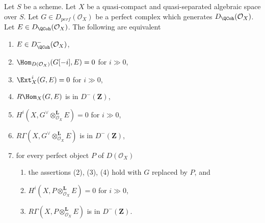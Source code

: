 \begin{proposition}
\label{proposition-detecting-bounded-above}
Let $S$ be a scheme.
Let $X$ be a quasi-compact and quasi-separated algebraic space over $S$.
Let $G \in D_{perf}(\mathcal{O}_X)$ be a perfect complex which generates
$D_\QCoh (\mathcal{O}_X)$. Let $E \in D_\QCoh (\mathcal{O}_X)$.
The following are equivalent
\begin{enumerate}
\item $E \in D^-_\QCoh (\mathcal{O}_X)$,
\item $\Hom_{D(\mathcal{O}_X)}(G[-i], E) = 0$ for $i \gg 0$,
\item $\Ext^i_X(G, E) = 0$ for $i \gg 0$,
\item $R\Hom_X(G, E)$ is in $D^-(\mathbf{Z})$,
\item $H^i(X, G^\vee \otimes_{\mathcal{O}_X}^\mathbf{L} E) = 0$
for $i \gg 0$,
\item $R\Gamma(X, G^\vee \otimes_{\mathcal{O}_X}^\mathbf{L} E)$
is in $D^-(\mathbf{Z})$,
\item for every perfect object $P$ of $D(\mathcal{O}_X)$
\begin{enumerate}
\item the assertions (2), (3), (4) hold with $G$ replaced by $P$, and
\item $H^i(X, P \otimes_{\mathcal{O}_X}^\mathbf{L} E) = 0$ for $i \gg 0$,
\item $R\Gamma(X, P \otimes_{\mathcal{O}_X}^\mathbf{L} E)$
is in $D^-(\mathbf{Z})$.
\end{enumerate}
\end{enumerate}
\end{proposition}

